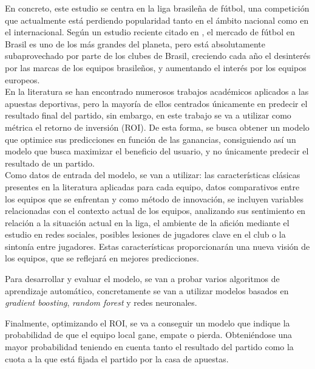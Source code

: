 En concreto, este estudio se centra en la liga brasileña de fútbol, una competición que actualmente está perdiendo popularidad tanto en el ámbito nacional como en el internacional. Según un estudio reciente citado en \cite{sportsvalue2025}, el mercado de fútbol en Brasil es uno de los más grandes del planeta, pero está absolutamente subaprovechado por parte de los clubes de Brasil, creciendo cada año el desinterés por las marcas de los equipos brasileños, y aumentando el interés por los equipos europeos.\\

En la literatura se han encontrado numerosos trabajos académicos aplicados a las apuestas deportivas, pero la mayoría de ellos centrados únicamente en predecir el resultado final del partido, sin embargo, en este trabajo se va a utilizar como métrica el retorno de inversión (ROI). De esta forma, se busca obtener un modelo que optimice sus predicciones en función de las ganancias, consiguiendo así un modelo que busca maximizar el beneficio del usuario, y no únicamente predecir el resultado de un partido.\\

Como datos de entrada del modelo, se van a utilizar: las características clásicas presentes en la literatura aplicadas para cada equipo, datos comparativos entre los equipos que se enfrentan y como método de innovación, se incluyen variables relacionadas con el contexto actual de los equipos, analizando sus sentimiento en relación a la situación actual en la liga, el ambiente de la afición mediante el estudio en redes sociales, posibles lesiones de jugadores clave en el club o la sintonía entre jugadores. Estas características proporcionarán una nueva visión de los equipos, que se reflejará en mejores predicciones.

Para desarrollar y evaluar el modelo, se van a probar varios algoritmos de aprendizaje automático, concretamente se van a utilizar modelos basados en \textit{gradient boosting}, \textit{random forest} y redes neuronales.

Finalmente, optimizando el ROI, se va a conseguir un modelo que indique la probabilidad de que el equipo local gane, empate o pierda. Obteniéndose una mayor probabilidad teniendo en cuenta tanto el resultado del partido como la cuota a la que está fijada el partido por la casa de apuestas.


